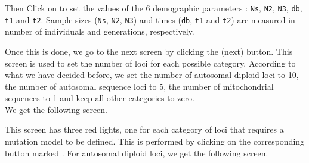 
Then Click on  to set the values of the 6 demographic parameters : \texttt{Ns}, \texttt{N2}, \texttt{N3}, \texttt{db}, \texttt{t1} and  \texttt{t2}. Sample sizes (\texttt{Ns}, \texttt{N2}, \texttt{N3}) and times (\texttt{db}, \texttt{t1} and  \texttt{t2}) are measured in number of individuals and generations, respectively.


Once this is done, we go to the next screen by clicking the  \fbox{$>>$} (next) button. This screen is used to set the number of loci for each possible category. According to what we have decided before, we set the number of autosomal diploid loci to 10, the number of autosomal sequence loci to 5, the number of mitochondrial sequences to 1 and keep all other categories to zero.\\
\newpage
 We get the following screen.


This screen has three red lights, one for each category of loci that requires a mutation model to be defined. This is performed by clicking on the corresponding button marked . For autosomal diploid loci, we get the following screen.




